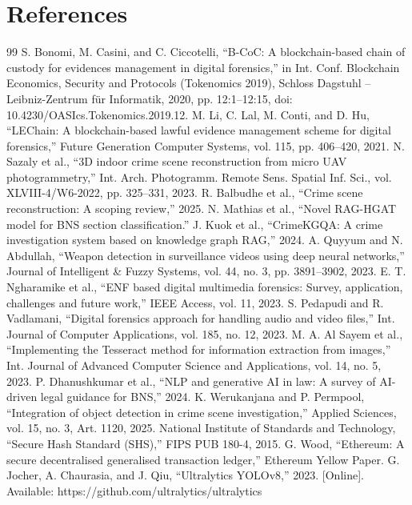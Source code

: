 \documentclass[12pt,a4paper,oneside]{report}
\begin{document}
\chapter*{References}
\begin{thebibliography}{99}
\setlength{\itemsep}{4pt}
 S. Bonomi, M. Casini, and C. Ciccotelli, ``B-CoC: A blockchain-based chain of custody for evidences management in digital forensics,'' in Int. Conf. Blockchain Economics, Security and Protocols (Tokenomics 2019), Schloss Dagstuhl -- Leibniz-Zentrum für Informatik, 2020, pp. 12:1--12:15, doi: 10.4230/OASIcs.Tokenomics.2019.12.
 M. Li, C. Lal, M. Conti, and D. Hu, ``LEChain: A blockchain-based lawful evidence management scheme for digital forensics,'' Future Generation Computer Systems, vol. 115, pp. 406--420, 2021.
 N. Sazaly et al., ``3D indoor crime scene reconstruction from micro UAV photogrammetry,'' Int. Arch. Photogramm. Remote Sens. Spatial Inf. Sci., vol. XLVIII-4/W6-2022, pp. 325--331, 2023.
 R. Balbudhe et al., ``Crime scene reconstruction: A scoping review,'' 2025.
 N. Mathias et al., ``Novel RAG-HGAT model for BNS section classification.''
 J. Kuok et al., ``CrimeKGQA: A crime investigation system based on knowledge graph RAG,'' 2024.
 A. Quyyum and N. Abdullah, ``Weapon detection in surveillance videos using deep neural networks,'' Journal of Intelligent \& Fuzzy Systems, vol. 44, no. 3, pp. 3891--3902, 2023.
 E. T. Ngharamike et al., ``ENF based digital multimedia forensics: Survey, application, challenges and future work,'' IEEE Access, vol. 11, 2023.
 S. Pedapudi and R. Vadlamani, ``Digital forensics approach for handling audio and video files,'' Int. Journal of Computer Applications, vol. 185, no. 12, 2023.
 M. A. Al Sayem et al., ``Implementing the Tesseract method for information extraction from images,'' Int. Journal of Advanced Computer Science and Applications, vol. 14, no. 5, 2023.
 P. Dhanushkumar et al., ``NLP and generative AI in law: A survey of AI-driven legal guidance for BNS,'' 2024.
 K. Werukanjana and P. Permpool, ``Integration of object detection in crime scene investigation,'' Applied Sciences, vol. 15, no. 3, Art. 1120, 2025.
 National Institute of Standards and Technology, ``Secure Hash Standard (SHS),'' FIPS PUB 180-4, 2015.
 G. Wood, ``Ethereum: A secure decentralised generalised transaction ledger,'' Ethereum Yellow Paper.
 G. Jocher, A. Chaurasia, and J. Qiu, ``Ultralytics YOLOv8,'' 2023. [Online]. Available: https://github.com/ultralytics/ultralytics

\end{thebibliography}
\end{document}
